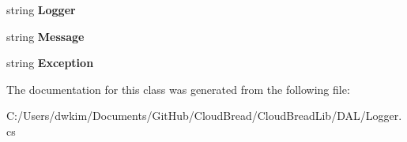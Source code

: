 \begin{DoxyCompactItemize}
\item 
string {\bfseries Logger}\hypertarget{a00026_a0e5a22fa79757a90b6afc8832e6ceffa}{}\label{a00026_a0e5a22fa79757a90b6afc8832e6ceffa}

\item 
string {\bfseries Message}\hypertarget{a00026_a502ed1378ed622cf1a13a6649ff1afce}{}\label{a00026_a502ed1378ed622cf1a13a6649ff1afce}

\item 
string {\bfseries Exception}\hypertarget{a00026_a92f31fabac35ccf19e1f9fc8dfb10aee}{}\label{a00026_a92f31fabac35ccf19e1f9fc8dfb10aee}

\end{DoxyCompactItemize}


The documentation for this class was generated from the following file\+:\begin{DoxyCompactItemize}
\item 
C\+:/\+Users/dwkim/\+Documents/\+Git\+Hub/\+Cloud\+Bread/\+Cloud\+Bread\+Lib/\+D\+A\+L/Logger.\+cs\end{DoxyCompactItemize}
